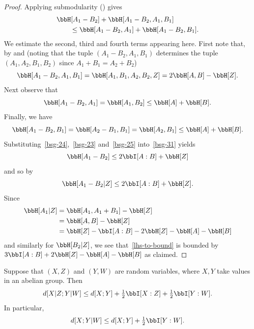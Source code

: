 \begin{proof}
Applying submodularity () gives
\begin{equation}\label{bsg-31} \begin{split}
&\bbH[A_1 - B_2] + \bbH[A_1 - B_2, A_1, B_1] \\
&\qquad \leq \bbH[A_1 - B_2, A_1] + \bbH[A_1 - B_2,B_1].
\end{split}\end{equation}
We estimate the second, third and fourth terms appearing here.
First note that, by  and  (noting that the tuple $(A_1 - B_2, A_1, B_1)$  determines the tuple $(A_1, A_2, B_1, B_2)$ since $A_1+B_1=A_2+B_2$)
\begin{equation}\label{bsg-24} \bbH[A_1 - B_2, A_1, B_1] = \bbH[A_1, B_1, A_2, B_2,Z] = 2\bbH[A,B] - \bbH[Z].\end{equation}
Next observe that
\begin{equation}\label{bsg-23} \bbH[A_1 - B_2, A_1] = \bbH[A_1, B_2] \leq \bbH[A] + \bbH[B].
\end{equation}
Finally, we have
\begin{equation}\label{bsg-25} \bbH[A_1 - B_2, B_1] = \bbH[A_2 - B_1, B_1] = \bbH[A_2, B_1] \leq \bbH[A] + \bbH[B].\end{equation}
Substituting~\eqref{bsg-24},~\eqref{bsg-23} and~\eqref{bsg-25} into~\eqref{bsg-31} yields
\[\bbH[A_1 - B_2] \leq 2 \bbI[A:B] + \bbH[Z]\] and so by 
\[\bbH[A_1 - B_2 | Z]  \leq 2 \bbI[A:B] + \bbH[Z].\]
Since
\begin{align*} \bbH[A_1 | Z] & = \bbH[A_1, A_1 + B_1] - \bbH[Z] \\ & = \bbH[A,B] - \bbH[Z] \\ & = \bbH[Z] -  \bbI[A:B] - 2 \bbH[Z]- \bbH[A]-\bbH[B]\end{align*}
and similarly for $\bbH[B_2 | Z]$, we see that~\eqref{lhs-to-bound} is bounded by
$3 \bbI[A:B] + 2\bbH[Z]-\bbH[A]-\bbH[B]$ as claimed.
\end{proof}


\begin{lemma}\label{cond-dist-fact}
  \leanok
  Suppose that $(X, Z)$ and $(Y, W)$ are random variables, where $X, Y$ take values in an abelian group. Then
  \[   d[X  | Z;Y | W] \leq d[X ; Y] + \tfrac{1}{2}  \bbI[X : Z] + \tfrac{1}{2}  \bbI[Y : W].\]
  In particular,
  \[   d[X ;Y | W] \leq d[X ; Y] + \tfrac{1}{2}  \bbI[Y : W].\]
\end{lemma}

